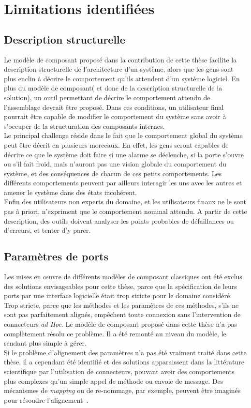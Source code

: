\section{Limitations identifiées}

\subsection{Description structurelle}

Le modèle de composant proposé dans la contribution de cette thèse facilite la description structurelle de l'architecture d'un système, alors que les gens sont plus enclin à décrire le comportement qu'ils attendent d'un système logiciel. En plus du modèle de composant( et donc de la description structurelle de la solution), un outil permettant de décrire le comportement attendu de l'assemblage devrait être proposé. Dans ces conditions, un utilisateur final pourrait être capable de modifier le comportement du système sans avoir à s'occuper de la structuration des composants internes.\\
Le principal challenge réside dans le fait que le comportement global du système peut être décrit en plusieurs morceaux. En effet, les gens seront capables de décrire ce que le système doit faire si une alarme se déclenche, si la porte s'ouvre ou s'il fait froid, mais n'auront pas une vision globale du comportement du système, et des conséquences de chacun de ces petits comportements. Les différents comportements peuvent par ailleurs interagir les uns avec les autres et amener le système dans des états incohérent.\\
Enfin des utilisateurs non experts du domaine, et les utilisateurs finaux ne le sont pas à priori, n'expriment que le comportement nominal attendu. A partir de cette description, des outils doivent analyser les points probables de défaillances ou d'erreurs, et tenter d'y parer.

\subsection{Paramètres de ports}
Les mises en \oe uvre de différents modèles de composant classiques ont été exclus des solutions envisageables pour cette thèse, parce que la spécification de leurs ports par une interface logicielle était trop stricte pour le domaine considéré. Trop stricte, parce que les méthodes et les paramètres de ces méthodes, s'ils ne sont pas parfaitement alignés, empêchent toute connexion sans l'intervention de connecteurs {\it ad-Hoc}. Le modèle de composant proposé dans cette thèse n'a pas complètement résolu ce problème. Il a été remonté au niveau du modèle, le rendant plus simple à gérer.\\
Si le problème d'alignement des paramètres n'a pas été vraiment traité dans cette thèse, il a cependant été identifié et des solutions apparaissent dans la littérature scientifique par l'utilisation de connecteurs, pouvant avoir des comportements plus complexes qu'un simple appel de méthode ou envoie de message. Des mécanismes de \textit{mapping} ou de re-nommage, par exemple, peuvent être imaginés pour résoudre l'alignement~\cite{mickaelICSE}.



